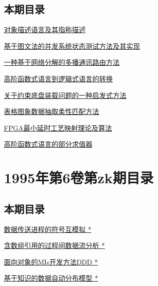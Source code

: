 \documentclass[a4paper]{article}
\begin{document}
\subsection{本期目录}
\href{http://www.jos.org.cn/ch/reader/download_pdf.aspx?file_no=19961001&year_id=1996&quarter_id=10&falg=1}{对象描述语言及其指称描述}

\href{http://www.jos.org.cn/ch/reader/download_pdf.aspx?file_no=19961002&year_id=1996&quarter_id=10&falg=1}{基于图文法的并发系统状态测试方法及其实现}

\href{http://www.jos.org.cn/ch/reader/download_pdf.aspx?file_no=19961003&year_id=1996&quarter_id=10&falg=1}{一种基于网络分解的多播通讯路由方法}

\href{http://www.jos.org.cn/ch/reader/download_pdf.aspx?file_no=19961004&year_id=1996&quarter_id=10&falg=1}{高阶函数式语言到逻辑式语言的转换}

\href{http://www.jos.org.cn/ch/reader/download_pdf.aspx?file_no=19961005&year_id=1996&quarter_id=10&falg=1}{关于约束底盘装载问题的一种启发式方法}

\href{http://www.jos.org.cn/ch/reader/download_pdf.aspx?file_no=19961006&year_id=1996&quarter_id=10&falg=1}{表格图象数据抽取柔性匹配方法}

\href{http://www.jos.org.cn/ch/reader/download_pdf.aspx?file_no=19961007&year_id=1996&quarter_id=10&falg=1}{FPGA最小延时工艺映射理论及算法}

\href{http://www.jos.org.cn/ch/reader/download_pdf.aspx?file_no=19961008&year_id=1996&quarter_id=10&falg=1}{高阶函数式语言的部分求值器}


\section{\textbf{1995年第6卷第zk期目录}}
\subsection{本期目录}
\href{http://www.jos.org.cn/ch/reader/download_pdf.aspx?file_no=1995s101&year_id=1995&quarter_id=zk&falg=1}{数据传送进程的符号互模拟 *}

\href{http://www.jos.org.cn/ch/reader/download_pdf.aspx?file_no=1995s102&year_id=1995&quarter_id=zk&falg=1}{含数组引用的过程间数据流分析 *}

\href{http://www.jos.org.cn/ch/reader/download_pdf.aspx?file_no=1995s103&year_id=1995&quarter_id=zk&falg=1}{面向对象的MIs开发方法DDD *}

\href{http://www.jos.org.cn/ch/reader/download_pdf.aspx?file_no=1995s104&year_id=1995&quarter_id=zk&falg=1}{基于知识的数据自动分布模型 *}
\end{document}
